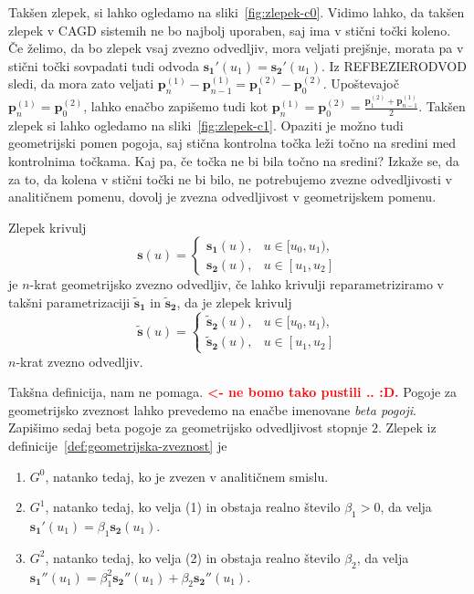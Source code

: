 \documentclass[isrm2, tisk]{fmfdelo}
\newcommand{\p}{\textbf{p}}
\newcommand{\mycomment}[1]{\textbf{\textcolor{red}{#1}}}
\begin{document}
    Takšen zlepek, si lahko ogledamo na sliki~\ref{fig:zlepek-c0}.
    Vidimo lahko, da takšen zlepek v CAGD sistemih ne bo najbolj uporaben, saj ima v stični točki koleno.
    Če želimo, da bo zlepek vsaj zvezno odvedljiv, mora veljati prejšnje, morata pa v stični točki sovpadati tudi odvoda $\mathbf{s_1}'(u_1) = \mathbf{s_2}'(u_1)$.
    Iz REFBEZIERODVOD sledi, da mora zato veljati $\p_{n}^{(1)} - \p_{n-1}^{(1)} = \p_{1}^{(2)} - \p_{0}^{(2)}$.
    Upoštevajoč $\p_n^{(1)} = \p_0^{(2)}$, lahko enačbo zapišemo tudi kot $\p_{n}^{(1)} =  \p_{0}^{(2)}  = \frac{\p_{1}^{(2)}+ \p_{n-1}^{(1)}}{2}$.
    Takšen zlepek si lahko ogledamo na sliki~\ref{fig:zlepek-c1}.
    Opaziti je možno tudi geometrijski pomen pogoja, saj stična kontrolna točka leži točno na sredini med kontrolnima točkama.
    Kaj pa, če točka ne bi bila točno na sredini?
    Izkaže se, da za to, da kolena v stični točki ne bi bilo, ne potrebujemo zvezne odvedljivosti v analitičnem pomenu, dovolj je zvezna odvedljivost v geometrijskem pomenu.
    \begin{definicija}
        \label{def:geometrijska-zveznost}
        Zlepek krivulj \[\mathbf{s}(u) = \begin{cases}
                                             \mathbf{s_1}(u), & u \in [u_0,u_1),  \\
                                             \mathbf{s_2}(u), & u \in [u_1,u_2]
        \end{cases}\] je $n$-krat geometrijsko zvezno odvedljiv, če lahko krivulji reparametriziramo v takšni parametrizaciji $\mathbf{\tilde{s}_1}$ in $\mathbf{\tilde{s}_2}$, da je zlepek krivulj
        \[\mathbf{\tilde{s}}(u) = \begin{cases}
                                      \mathbf{\tilde{s}_2}(u), & u \in [u_0,u_1),  \\
                                      \mathbf{\tilde{s}_2}(u), & u \in [u_1,u_2]
        \end{cases}\] $n$-krat zvezno odvedljiv.
    \end{definicija}
    Takšna definicija, nam ne pomaga. \mycomment{<- ne bomo tako pustili .. :D.}
    Pogoje za geometrijsko zveznost lahko prevedemo na enačbe imenovane \textit{beta pogoji}.
    Zapišimo sedaj beta pogoje za geometrijsko odvedljivost stopnje $2$.
    Zlepek iz definicije~\ref{def:geometrijska-zveznost} je
    \begin{enumerate}
        \item $G^0$, natanko tedaj, ko je zvezen v analitičnem smislu.
        \item $G^1$, natanko tedaj, ko velja (1) in obstaja realno število $\beta_1>0$, da velja $\mathbf{s_1'}(u_1) =\beta_1\mathbf{s_2}(u_1)$.
        \item $G^2$, natanko tedaj, ko velja (2) in obstaja realno število $\beta_2$, da velja $\mathbf{s_1''}(u_1) =\beta_1^2\mathbf{s_2''}(u_1) + \beta_2\mathbf{s_2''}(u_1)$.
    \end{enumerate}
\end{document}

